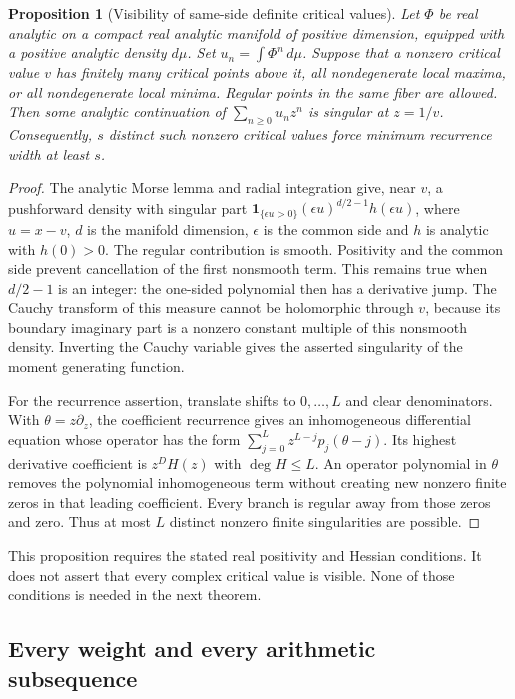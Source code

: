 \documentclass[11pt,a4paper]{article}
\newtheorem{proposition}[theorem]{Proposition}
\theoremstyle{definition}
\theoremstyle{remark}
\numberwithin{equation}{section}
\begin{document}
\begin{proposition}[Visibility of same-side definite critical values]
\label{p8:ac:visibility}
Let $\Phi$ be real analytic on a compact real analytic manifold of
positive dimension, equipped with a positive analytic density $d\mu$.
Set $u_n=\int\Phi^n\,d\mu$. Suppose that a nonzero critical value $v$
has finitely many critical points above it, all nondegenerate local
maxima, or all nondegenerate local minima. Regular points in the same
fiber are allowed. Then some analytic continuation of
$\sum_{n\ge0}u_nz^n$ is singular at $z=1/v$. Consequently, $s$
distinct such nonzero critical values force minimum recurrence width
at least $s$.
\end{proposition}
\begin{proof}
The analytic Morse lemma and radial integration give, near $v$, a
pushforward density with singular part
$\mathbf1_{\{\epsilon u>0\}}(\epsilon u)^{d/2-1}h(\epsilon u)$,
where $u=x-v$, $d$ is the manifold dimension, $\epsilon$ is the
common side and $h$ is analytic with $h(0)>0$. The regular contribution
is smooth. Positivity and the common side prevent cancellation of the
first nonsmooth term. This remains true when $d/2-1$ is an integer:
the one-sided polynomial then has a derivative jump. The Cauchy
transform of this measure cannot be holomorphic through $v$, because
its boundary imaginary part is a nonzero constant multiple of this
nonsmooth density. Inverting the Cauchy variable gives the asserted
singularity of the moment generating function.

For the recurrence assertion, translate shifts to $0,\ldots,L$ and
clear denominators. With $\theta=z\partial_z$, the coefficient
recurrence gives an inhomogeneous differential equation whose operator
has the form $\sum_{j=0}^Lz^{L-j}p_j(\theta-j)$. Its highest derivative
coefficient is $z^D H(z)$ with $\deg H\le L$. An operator polynomial
in $\theta$ removes the polynomial inhomogeneous term without creating
new nonzero finite zeros in that leading coefficient. Every branch is
regular away from those zeros and zero. Thus at most $L$ distinct
nonzero finite singularities are possible.
\end{proof}

This proposition requires the stated real positivity and Hessian
conditions. It does not assert that every complex critical value is
visible. None of those conditions is needed in the next theorem.

\subsection{Every weight and every arithmetic subsequence}
\end{document}
